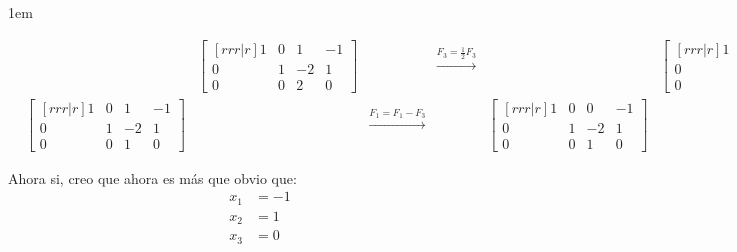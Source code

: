\documentclass[12pt, fleqn]{report}                             %
\newenvironment{SmallIndentation}[1][0.75em]                    %
        {\begin{adjustwidth}{#1}{}\begin{footnotesize}}             %
        {\end{footnotesize}\end{adjustwidth}}                       %
\theoremstyle{break}                                            %
\newcommand \lLongTo {\longrightarrow}                          %
\begin{document}
\begin{SmallIndentation}[1em]
\begin{align*}
                        &&
                        \begin{bmatrix}[r r r | r]
                            1 & 0  & 1   & -1       \\
                            0 & 1  & -2  &  1       \\
                            0 & 0  &  2  & 0  
                        \end{bmatrix}
                        &&
                        \overset{F_3 = \frac{1}{2}F_3}{\lLongTo}
                        &&
                        \begin{bmatrix}[r r r | r]
                            1 & 0  &  1  & -1       \\
                            0 & 1  & -2  &  1       \\
                            0 & 0  &  1  &  0  
                        \end{bmatrix}
                        \\
                        &
                        \begin{bmatrix}[r r r | r]
                            1 & 0  &  1  & -1       \\
                            0 & 1  & -2  &  1       \\
                            0 & 0  &  1  &  0  
                        \end{bmatrix}
                        &&
                        \overset{F_1 = F_1 - F_3}{\lLongTo}
                        &&
                        \begin{bmatrix}[r r r | r]
                            1 & 0  &  0  & -1       \\
                            0 & 1  & -2  &  1       \\
                            0 & 0  &  1  &  0  
                        \end{bmatrix}
                        &&
                        \overset{F_2 = F_2 + 2F_3}{\lLongTo}
                        &&
                        \begin{bmatrix}[r r r | r]
                            1 & 0  &  0  & -1       \\
                            0 & 1  &  0  &  1       \\
                            0 & 0  &  1  &  0  
                        \end{bmatrix}
                    \end{align*}

                    Ahora si, creo que ahora es más que obvio que:
                    \begin{align*}
                        x_1 &= -1   \\
                        x_2 &=  1   \\
                        x_3 &=  0
                    \end{align*}

            \end{SmallIndentation}
                
\end{document}

